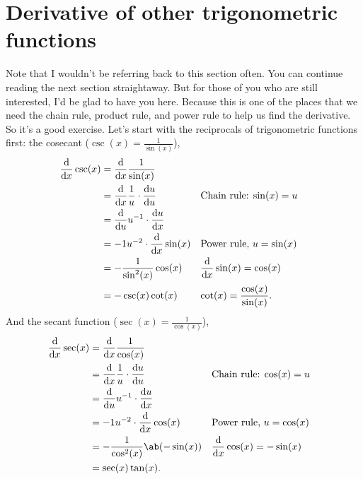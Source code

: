 \section{Derivative of other trigonometric functions}

Note that I wouldn't be referring back to this section often. You can continue reading the next section straightaway. But for those of you who are still interested, I'd be glad to have you here. Because this is one of the places that we need the chain rule, product rule, and power rule to help us find the derivative. So it's a good exercise. Let's start with the reciprocals of trigonometric functions first: the cosecant ($\csc(x) = \frac{1}{\sin(x)}$),
\begin{align}
	\odv*{\csc(x)}{x} &= \odv*{\frac{1}{\sin(x)}}{x} \\
						&= \odv*{\frac{1}{u}}{x} \cdot \odv{u}{u} && \textrm{Chain rule: $\sin(x) = u$} \\
						&= \odv*{u^{-1}}{u} \cdot \odv{u}{x} \\
						&= -1u^{-2}\cdot\odv*{\sin(x)}{x} && \textrm{Power rule, $u = \sin(x)$} \\
						&= -\frac{1}{\sin^2(x)}\cos(x) && \textrm{$\odv*{\sin(x)}{x} = \cos(x)$} \\
						&= -\csc(x)\cot(x) && \textrm{$\cot(x) = \frac{\cos(x)}{\sin(x)}$}.
\end{align}
And the secant function ($\sec(x) = \frac{1}{\cos(x)}$),
\begin{align}
	\odv*{\sec(x)}{x} &= \odv*{\frac{1}{\cos(x)}}{x} \\
					  &= \odv*{\frac{1}{u}}{x} \cdot \odv{u}{u} && \textrm{Chain rule: $\cos(x) = u$} \\
					  &= \odv*{u^{-1}}{u} \cdot \odv{u}{x} \\
					  &= -1u^{-2}\cdot\odv*{\cos(x)}{x} && \textrm{Power rule, $u = \cos(x)$}\\
					  &= -\frac{1}{\cos^{2}(x)}\ab(-\sin(x)) && \textrm{$\odv*{\cos(x)}{x} = -\sin(x)$} \\
					  &= \sec(x)\tan(x).
\end{align}

